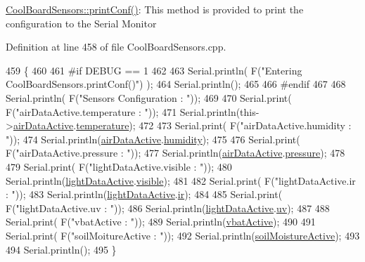 \hyperlink{class_cool_board_sensors_af6fd79505815b204c178617ecf54c873}{Cool\+Board\+Sensors\+::print\+Conf()}\+: This method is provided to print the configuration to the Serial Monitor 

Definition at line 458 of file Cool\+Board\+Sensors.\+cpp.


\begin{DoxyCode}
459 \{
460 
461 \textcolor{preprocessor}{#if DEBUG == 1}
462 
463     Serial.println( F(\textcolor{stringliteral}{"Entering CoolBoardSensors.printConf()"}) );
464     Serial.println();
465 
466 \textcolor{preprocessor}{#endif}
467 
468     Serial.println( F(\textcolor{stringliteral}{"Sensors Configuration : "}));
469     
470     Serial.print( F(\textcolor{stringliteral}{"airDataActive.temperature : "}));
471     Serial.println(this->\hyperlink{class_cool_board_sensors_abff8dfeccb2f7689847bb64d5f1cd31e}{airDataActive}.\hyperlink{struct_cool_board_sensors_1_1air_active_ac08576736c7ac3bfbfec32e5ee17c686}{temperature});
472 
473     Serial.print( F(\textcolor{stringliteral}{"airDataActive.humidity : "}));
474     Serial.println(\hyperlink{class_cool_board_sensors_abff8dfeccb2f7689847bb64d5f1cd31e}{airDataActive}.\hyperlink{struct_cool_board_sensors_1_1air_active_ab69738e9fd1c2ba80dc666bcd1e116f7}{humidity});
475 
476     Serial.print( F(\textcolor{stringliteral}{"airDataActive.pressure : "}));
477     Serial.println(\hyperlink{class_cool_board_sensors_abff8dfeccb2f7689847bb64d5f1cd31e}{airDataActive}.\hyperlink{struct_cool_board_sensors_1_1air_active_a15932ccfb6ee6603713d937ec9b76b72}{pressure});
478 
479     Serial.print( F(\textcolor{stringliteral}{"lightDataActive.visible : "}));
480     Serial.println(\hyperlink{class_cool_board_sensors_ac4deb1cf41bac8b91c780c92fab00ba4}{lightDataActive}.\hyperlink{struct_cool_board_sensors_1_1light_active_a9c351100969d0dc055ad2e6712cc7ac8}{visible});
481 
482     Serial.print( F(\textcolor{stringliteral}{"lightDataActive.ir : "}));
483     Serial.println(\hyperlink{class_cool_board_sensors_ac4deb1cf41bac8b91c780c92fab00ba4}{lightDataActive}.\hyperlink{struct_cool_board_sensors_1_1light_active_a4c21258d3c89c6292740d6deb10f9dcc}{ir});
484 
485     Serial.print( F(\textcolor{stringliteral}{"lightDataActive.uv : "}));
486     Serial.println(\hyperlink{class_cool_board_sensors_ac4deb1cf41bac8b91c780c92fab00ba4}{lightDataActive}.\hyperlink{struct_cool_board_sensors_1_1light_active_a0e6cfc311425a31f32c32fc3b834ffb8}{uv});
487     
488     Serial.print( F(\textcolor{stringliteral}{"vbatActive : "}));
489     Serial.println(\hyperlink{class_cool_board_sensors_ab0b4bbae83796b52b90f91008d383583}{vbatActive});
490 
491     Serial.print( F(\textcolor{stringliteral}{"soilMoitureActive : "}));
492     Serial.println(\hyperlink{class_cool_board_sensors_ae7971bf527781ac4994309591b78ab89}{soilMoistureActive});
493 
494     Serial.println();
495 \}
\end{DoxyCode}
